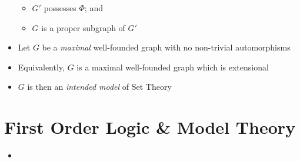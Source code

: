 \begin{itemize}
\begin{itemize}
		\item $ G' $ possesses $ \Phi $; and
		\item $ G $ is a proper subgraph of $ G' $
		
	\end{itemize}
	
	\item Let $ G $ be a \textit{maximal} well-founded graph with no non-trivial automorphisms
	
	\item Equivalently, $ G $ is a maximal well-founded graph which is extensional
	
	\item $ G $ is then an \textit{intended model} of Set Theory
	
\end{itemize}

\section{First Order Logic \& Model Theory}

\begin{itemize}
	
	\item 
	
\end{itemize}